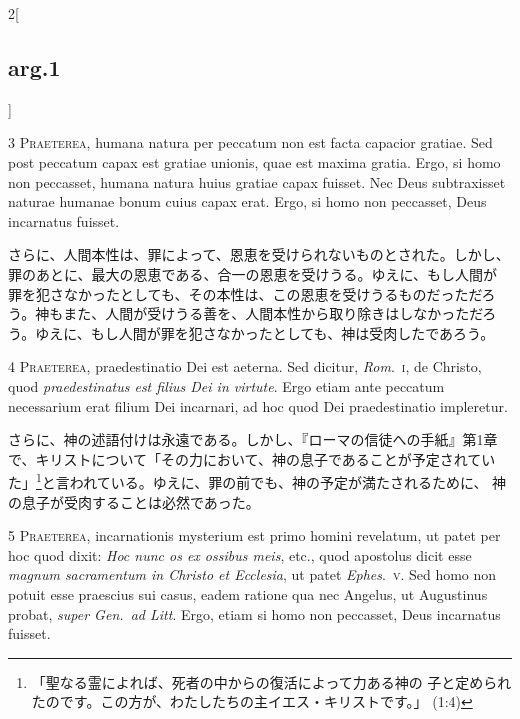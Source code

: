 \documentclass[paper=a4paper,fontsize=10pt,jafontsize=9pt,titlepage]{jlreq}
\begin{document}
\begin{paracol}{2}[\subsection{arg.1}]

3 {\scshape Praeterea}, humana natura per peccatum non
est facta capacior gratiae. Sed post peccatum capax est gratiae unionis,
quae est maxima gratia. Ergo, si homo non peccasset, humana natura huius
gratiae capax fuisset. Nec Deus subtraxisset naturae humanae bonum cuius
capax erat. Ergo, si homo non peccasset, Deus incarnatus fuisset.

\switchcolumn

さらに、人間本性は、罪によって、恩恵を受けられないものとされた。しかし、
 罪のあとに、最大の恩恵である、合一の恩恵を受けうる。ゆえに、もし人間が
 罪を犯さなかったとしても、その本性は、この恩恵を受けうるものだっただろ
 う。神もまた、人間が受けうる善を、人間本性から取り除きはしなかっただろ
 う。ゆえに、もし人間が罪を犯さなかったとしても、神は受肉したであろう。


4 {\scshape Praeterea}, praedestinatio Dei est
aeterna. Sed dicitur, {\itshape Rom}.~{\scshape i}, de Christo, quod {\itshape praedestinatus est filius
Dei in virtute}. Ergo etiam ante peccatum necessarium erat filium Dei
incarnari, ad hoc quod Dei praedestinatio impleretur.

\switchcolumn

さらに、神の述語付けは永遠である。しかし、『ローマの信徒への手紙』第1章
 で、キリストについて「その力において、神の息子であることが予定されてい
 た」\footnote{「聖なる霊によれば、死者の中からの復活によって力ある神の
 子と定められたのです。この方が、わたしたちの主イエス・キリストです。」
 (1:4)}と言われている。ゆえに、罪の前でも、神の予定が満たされるために、
神の息子が受肉することは必然であった。


5 {\scshape Praeterea}, incarnationis mysterium est
primo homini revelatum, ut patet per hoc quod dixit: {\itshape Hoc nunc os ex
ossibus meis}, etc., quod apostolus dicit esse {\itshape magnum sacramentum in
Christo et Ecclesia}, ut patet {\itshape Ephes}.~{\scshape v}. Sed homo non potuit esse
praescius sui casus, eadem ratione qua nec Angelus, ut Augustinus
probat, {\itshape super Gen.~ad Litt}. Ergo, etiam si homo non peccasset, Deus
incarnatus fuisset.


\end{paracol}
\end{document}

